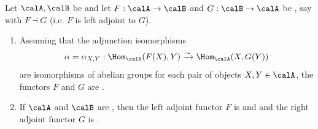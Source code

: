 \begin{proposition} \label{proposition:left_right_adjoint_of_add_cats_is_add_and_right_left_exact_if_between_ab_cats}
    Let $\calA, \calB$ be  and let $F: \calA \to \calB$ and $G: \calB \to \calA$ be  , say with $F \dashv G$ (i.e. $F$ is left adjoint to $G$). 
    \begin{enumerate}
        \item Assuming that the adjunction isomorphisms
        $$\alpha = \alpha_{X,Y}: \Hom_\calB(F(X), Y) \xrightarrow{\sim} \Hom_\calA(X, G(Y))$$
        are isomorphisms of abelian groups for each pair of objects $X,Y \in \calA$, the functors $F$ and $G$ are .
        \item If $\calA$ and $\calB$ are , then the left adjoint functor $F$ is  and and the right adjoint functor $G$ is .
    \end{enumerate}
\end{proposition}
